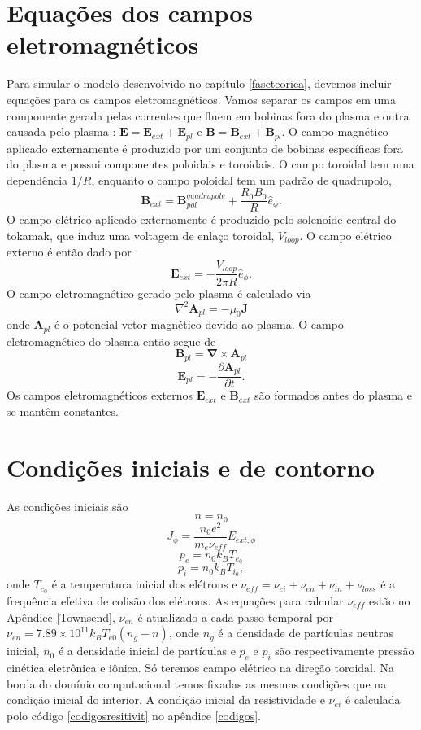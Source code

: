 \documentclass[12pt,oneside,a4paper]{abntex2}
\begin{document}
\section{Equações dos campos eletromagnéticos}
\noindent Para simular o modelo desenvolvido no capítulo \ref{faseteorica}, devemos incluir equações para os campos eletromagnéticos. Vamos separar os campos em uma componente gerada pelas correntes que fluem em bobinas fora do plasma e outra causada pelo plasma \cite[cap. 2]{MagneticControl}: $\bm{E} = \bm{E}_{ext} + \bm{E}_{pl}$ e $\bm{B} = \bm{B}_{ext} + \bm{B}_{pl}$. O campo magnético aplicado externamente é produzido por um conjunto de bobinas específicas fora do plasma e possui componentes poloidais e toroidais. O campo toroidal tem uma dependência $1 / R$, enquanto o campo poloidal tem um padrão de quadrupolo,
\begin{equation}
\label{Bext}
\bm{B}_{ext}=\bm{B}_{pol}^{quadrupole}+\frac{R_0B_0}{R}\hat{e}_{\phi} .
\end{equation}
O campo elétrico aplicado externamente é produzido pelo solenoide central do tokamak, que induz uma voltagem de enlaço toroidal, $V_{loop}$. O campo elétrico externo é então dado por
\begin{equation}
\label{Eext}
\bm{E}_{ext} = -\frac{V_{loop}}{2\pi R} \hat{e}_{\phi} .
\end{equation}
O campo eletromagnético gerado pelo plasma é calculado via
\begin{equation}
\nabla^2 \bm{A}_{pl}=-\mu_0\bm{J} 
\end{equation}
onde $\bm{A}_{pl}$ é o potencial vetor magnético devido ao plasma. O campo eletromagnético do plasma então segue de
\begin{equation}
\bm{B}_{pl} = \bm{\nabla} \times \bm{A}_{pl}
\end{equation}
\begin{equation}
\bm{E}_{pl}=-\frac{\partial \bm{A}_{pl}}{\partial t} .
\end{equation}
Os campos eletromagnéticos externos $\bm{E}_{ext}$ e $\bm{B}_{ext}$ são formados antes do plasma e se mantêm constantes. 

\section{Condições iniciais e de contorno}
\noindent As condições iniciais são
$$n = n_0$$
$$J_{\phi}= \frac{n_0 e^2 }{m_e \nu_{eff}} E_{ext,\phi}$$
$$p_e=n_0 k_B T_{e_0}$$
$$p_i=n_0 k_B T_{i_0}, $$
onde $T_{e_0}$ é a temperatura inicial dos elétrons e $\nu_{eff}=\nu_{ei} + \nu_{en} + \nu_{in} + \nu_{loss}$ é a frequência efetiva de colisão dos elétrons. As equações para calcular $\nu_{eff}$ estão no Apêndice \ref{Townsend}, $\nu_{en}$ é atualizado a cada passo temporal por $\nu_{en}=7.89 \times 10^{11} k_B T_{e0}(n_g-n)$, onde $n_g$ é a densidade de partículas neutras inicial, $n_0$ é a densidade inicial de partículas e $p_e$ e $p_i$ são respectivamente pressão cinética eletrônica e iônica. Só teremos campo elétrico na direção toroidal. 
Na borda do domínio computacional temos fixadas as mesmas condições que na condição inicial do interior.
A condição inicial da resistividade e $\nu_{ei}$ é calculada polo código \ref{codigosresitivit} no apêndice \ref{codigos}.
%
\end{document}
